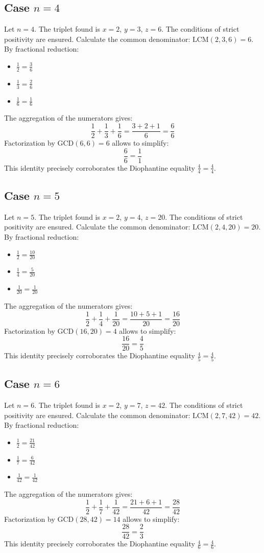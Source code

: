 \documentclass[11pt,a4paper]{article}
\begin{document}
\subsection{Case $n = 4$}
Let $n = 4$. The triplet found is $x = 2$, $y = 3$, $z = 6$.
The conditions of strict positivity are ensured.
Calculate the common denominator: $\text{LCM}(2, 3, 6) = 6$.
By fractional reduction:
\begin{itemize}
    \item $\frac{1}{2} = \frac{3}{6}$
    \item $\frac{1}{3} = \frac{2}{6}$
    \item $\frac{1}{6} = \frac{1}{6}$
\end{itemize}
The aggregation of the numerators gives:
$$ \frac{1}{2} + \frac{1}{3} + \frac{1}{6} = \frac{3 + 2 + 1}{6} = \frac{6}{6} $$
Factorization by $\text{GCD}(6, 6) = 6$ allows to simplify:
$$ \frac{6}{6} = \frac{1}{1} $$
This identity precisely corroborates the Diophantine equality $\frac{4}{4} = \frac{4}{4}$.

\subsection{Case $n = 5$}
Let $n = 5$. The triplet found is $x = 2$, $y = 4$, $z = 20$.
The conditions of strict positivity are ensured.
Calculate the common denominator: $\text{LCM}(2, 4, 20) = 20$.
By fractional reduction:
\begin{itemize}
    \item $\frac{1}{2} = \frac{10}{20}$
    \item $\frac{1}{4} = \frac{5}{20}$
    \item $\frac{1}{20} = \frac{1}{20}$
\end{itemize}
The aggregation of the numerators gives:
$$ \frac{1}{2} + \frac{1}{4} + \frac{1}{20} = \frac{10 + 5 + 1}{20} = \frac{16}{20} $$
Factorization by $\text{GCD}(16, 20) = 4$ allows to simplify:
$$ \frac{16}{20} = \frac{4}{5} $$
This identity precisely corroborates the Diophantine equality $\frac{4}{5} = \frac{4}{5}$.

\subsection{Case $n = 6$}
Let $n = 6$. The triplet found is $x = 2$, $y = 7$, $z = 42$.
The conditions of strict positivity are ensured.
Calculate the common denominator: $\text{LCM}(2, 7, 42) = 42$.
By fractional reduction:
\begin{itemize}
    \item $\frac{1}{2} = \frac{21}{42}$
    \item $\frac{1}{7} = \frac{6}{42}$
    \item $\frac{1}{42} = \frac{1}{42}$
\end{itemize}
The aggregation of the numerators gives:
$$ \frac{1}{2} + \frac{1}{7} + \frac{1}{42} = \frac{21 + 6 + 1}{42} = \frac{28}{42} $$
Factorization by $\text{GCD}(28, 42) = 14$ allows to simplify:
$$ \frac{28}{42} = \frac{2}{3} $$
This identity precisely corroborates the Diophantine equality $\frac{4}{6} = \frac{4}{6}$.
\end{document}
